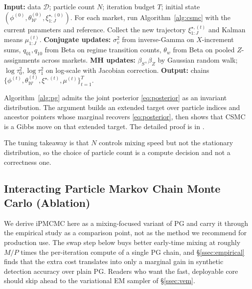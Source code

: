 \begin{algorithm}[t]
\caption{Particle Gibbs}\label{alg:pg}
\begin{algorithmic}[1]
\STATE \textbf{Input:} data $\mathcal{D}$; particle count $N$; iteration budget $T$; initial state $(\phi^{(0)}, \theta^{(0)}_{\mathcal{W}}, \xi^{\star,(0)}_{1:J})$.
  \STATE For each market, run Algorithm~\ref{alg:csmc} with the current parameters and reference. Collect the new trajectory $\xi^{\star,(t)}_{1:J}$ and Kalman means $\mu^{(t)}_{1:J}$.
  \STATE \textbf{Conjugate updates:} $\sigma^2_v$ from inverse-Gamma on $X$-increment sums, $q_{01}, q_{10}$ from Beta on regime transition counts, $\theta_w$ from Beta on pooled $Z$-assignments across markets.
  \STATE \textbf{MH updates:} $\beta_S, \beta_Z$ by Gaussian random walk; $\log\tau^2_0, \log\tau^2_1$ on log-scale with Jacobian correction.
\ENDFOR
\STATE \textbf{Output:} chains $\{\phi^{(t)}, \theta^{(t)}_{\mathcal{W}}, \xi^{\star,(t)}, \mu^{(t)}\}_{t=1}^T$.
\end{algorithmic}
\end{algorithm}

\begin{theorem}\label{thm:pg-invariance}
Algorithm~\ref{alg:pg} admits the joint posterior \eqref{eq:posterior} as an invariant distribution. The argument builds an extended target over particle indices and ancestor pointers whose marginal recovers \eqref{eq:posterior}, then shows that CSMC is a Gibbs move on that extended target. The detailed proof is in \citet[Ch.~16]{chopin2020smc}.
\end{theorem}

The tuning takeaway is that $N$ controls mixing speed but not the stationary distribution, so the choice of particle count is a compute decision and not a correctness one.

\subsection{Interacting Particle Markov Chain Monte Carlo (Ablation)}\label{ssec:ipmcmc}

We derive iPMCMC here as a mixing-focused variant of PG and carry it through the empirical study as a comparison point, not as the method we recommend for production use. The swap step below buys better early-time mixing at roughly $M/P$ times the per-iteration compute of a single PG chain, and \S\ref{ssec:empirical} finds that the extra cost translates into only a marginal gain in synthetic detection accuracy over plain PG. Readers who want the fast, deployable core should skip ahead to the variational EM sampler of \S\ref{ssec:vem}.

